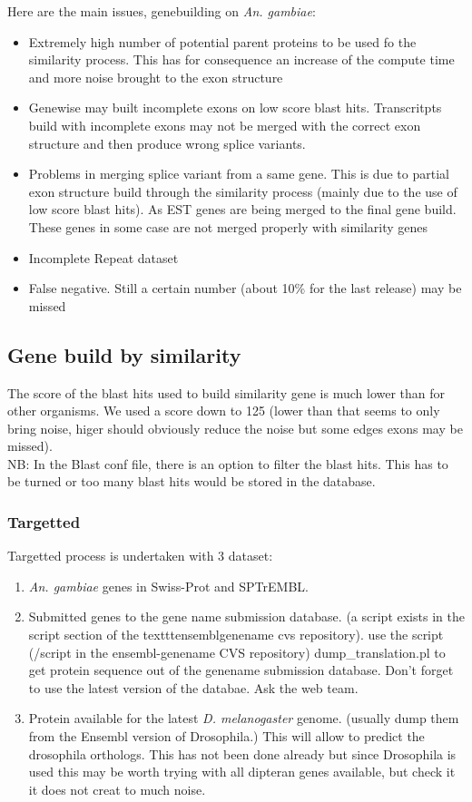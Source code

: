 \documentclass[a4paper,10pt]{article}
\begin{document}
Here are the main issues, genebuilding on \textit{An. gambiae}:
\begin{itemize}
\item Extremely high number of potential parent proteins to be used fo the similarity process. This has for consequence an increase of the compute time and more noise brought to the exon structure
\item Genewise may built incomplete exons on low score blast hits. Transcritpts build with incomplete exons may not be merged with the correct exon structure and then produce wrong splice variants.
\item Problems in merging splice variant from a same gene. This is due to partial exon structure build through the similarity process (mainly due to the use of low score blast hits). As EST genes are being merged to the final gene build. These genes in some case are not merged properly with similarity genes
\item Incomplete Repeat dataset
\item False negative. Still a certain number (about 10\% for the last release) may be missed
\end{itemize}

\subsection{Gene build by similarity}
The score of the blast hits used to build similarity gene is much lower than for other organisms. We used a score down to 125 (lower than that seems to only bring noise, higer should obviously reduce the noise but some edges exons may be missed).
\\
NB: In the Blast conf file, there is an option to filter the blast hits. This has to be turned or too many blast hits would be stored in the database.

\subsubsection{Targetted}
Targetted process is undertaken with 3 dataset:
\begin{enumerate}
\item \textit{An. gambiae} genes in Swiss-Prot and SPTrEMBL.
\item Submitted genes to the gene name submission database. (a script exists in the script section of the texttt{ensembl\-genename} cvs repository). use the script (/script in the ensembl-genename CVS repository) dump\_translation.pl to get protein sequence out of the genename submission database. Don't forget to use the latest version of the databae. Ask the web team.
\item Protein available for the latest \textit{D. melanogaster} genome. (usually dump them from the Ensembl version of Drosophila.) This will allow to predict the drosophila orthologs. This has not been done already but since Drosophila is used this may be worth trying with all dipteran genes available, but check it it does not creat to much noise.
\end{enumerate}
\end{document}
